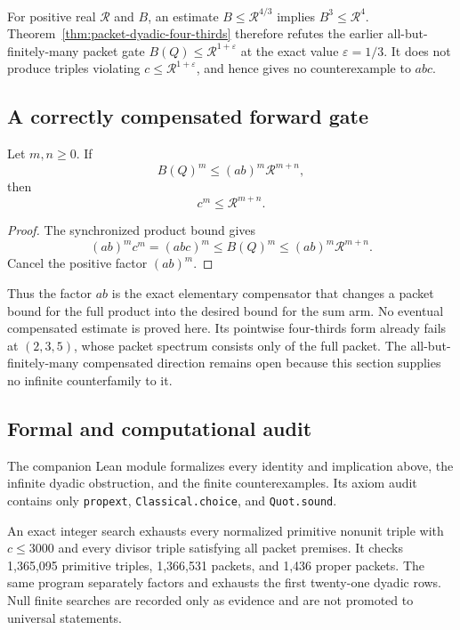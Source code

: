 For positive real $\mathcal R$ and $B$, an estimate
$B\le \mathcal R^{4/3}$ implies
$B^3\le \mathcal R^4$.  Theorem~\ref{thm:packet-dyadic-four-thirds} therefore
refutes the earlier all-but-finitely-many packet gate
$B(Q)\le \mathcal R^{1+\varepsilon}$ at the exact value
$\varepsilon=1/3$.  It does not produce triples violating
$c\le \mathcal R^{1+\varepsilon}$, and hence gives no
counterexample to $abc$.

\subsection{A correctly compensated forward gate}

\begin{theorem}
\label{thm:packet-compensated-implication}
Let $m,n\ge0$.  If
\[
 B(Q)^m\le (ab)^m\mathcal R^{m+n},
\]
then
\[
 c^m\le \mathcal R^{m+n}.
\]
\end{theorem}

\begin{proof}
The synchronized product bound gives
\[
 (ab)^mc^m=(abc)^m\le B(Q)^m
 \le (ab)^m\mathcal R^{m+n}.
\]
Cancel the positive factor $(ab)^m$.
\end{proof}

Thus the factor $ab$ is the exact elementary compensator that changes a
packet bound for the full product into the desired bound for the sum arm.
No eventual compensated estimate is proved here.  Its pointwise
four-thirds form already fails at $(2,3,5)$, whose packet spectrum consists
only of the full packet.  The all-but-finitely-many compensated direction
remains open because this section supplies no infinite counterfamily to it.

\subsection{Formal and computational audit}

The companion Lean module formalizes every identity and implication above,
the infinite dyadic obstruction, and the finite counterexamples.  Its axiom
audit contains only
\texttt{propext},
\texttt{Classical}\allowbreak\texttt{.choice}, and
\texttt{Quot}\allowbreak\texttt{.sound}.

An exact integer search exhausts every normalized primitive nonunit triple
with $c\le3000$ and every divisor triple satisfying all packet premises.  It
checks 1,365,095 primitive triples, 1,366,531 packets, and 1,436 proper
packets.  The same program separately factors and exhausts the first
twenty-one dyadic rows.  Null finite searches are recorded only as evidence
and are not promoted to universal statements.
